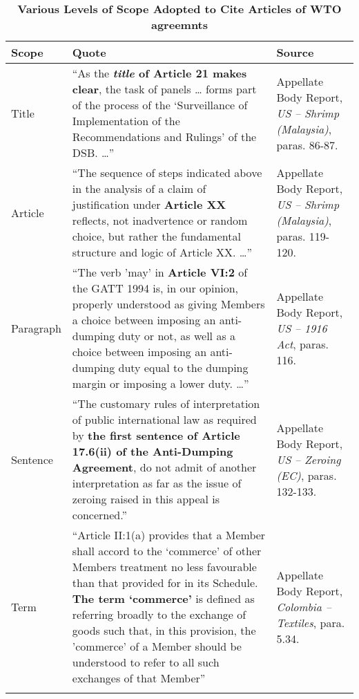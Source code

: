 
\begin{xltabular}{\linewidth}{lXX}
    \caption{\textbf{Various Levels of Scope Adopted to Cite Articles of WTO agreemnts}}\\
    \hline
    \textbf{\normalsize Scope} 
    & \textbf{\normalsize Quote}
    & \textbf{\normalsize Source}
    \\
    \endfirsthead
    \hline \hline
    Title
    & ``As the \textbf{\textit{title}
    of Article 21 makes clear}, 
    the task of panels \ldots
    forms part of the process
    of the `Surveillance of 
    Implementation of the 
    Recommendations and Rulings' of the
    DSB. \ldots'' 
    & Appellate Body Report, \textit{US – Shrimp (Malaysia)}, paras. 86-87.
    \\
    \hline
    Article 
    &  ``The sequence of steps indicated above in the analysis of a claim of justification under \textbf{Article XX} reflects, not inadvertence or random choice, but rather the fundamental structure and logic of Article XX. \ldots''
    & Appellate Body Report, \textit{US – Shrimp (Malaysia)}, paras. 119-120.
    \\
    \hline
    Paragraph
    &  ``The verb 'may' in \textbf{Article VI:2} of the GATT 1994 is, in our opinion, properly
    understood as giving Members a choice between imposing an anti-dumping duty or
    not, as well as a choice between imposing an anti-dumping duty equal to the dumping
    margin or imposing a lower duty. \ldots''
    & Appellate Body Report, \textit{US – 1916 Act}, paras. 116.     
    \\
    \hline
    Sentence 
    & ``The customary rules of interpretation of public international law as
    required by \textbf{the first sentence of Article 17.6(ii) of the Anti-Dumping Agreement}, do
    not admit of another interpretation as far as the issue of zeroing raised in this appeal
    is concerned.''
    & Appellate Body Report, \textit{US – Zeroing (EC)}, paras. 132-133.
    \\
    \hline
    Term
    & ``Article II:1(a) provides that a
    Member shall accord to the `commerce' of other Members treatment no less
    favourable than that provided for in its Schedule. \textbf{The term `commerce'} is defined as
    referring broadly to the exchange of goods such that, in this provision, the 'commerce'
    of a Member should be understood to refer to all such exchanges of that Member''
    & Appellate Body Report, \textit{Colombia – Textiles}, para. 5.34.
    \\
    \hline
    \label{xltabular:level-of-scopes}
\end{xltabular}


